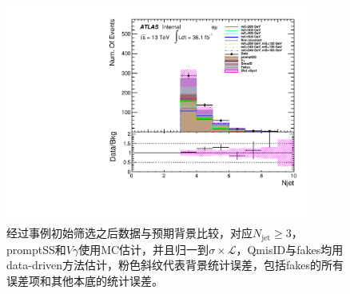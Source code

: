 \begin{figure}[h]
\begin{minipage}[t]{0.33\linewidth}
\end{minipage}
\begin{minipage}[t]{0.33\linewidth}
\centering
\includegraphics[width=0.9\textwidth,angle=-90]{fig/dataMC_high_Njet_CR/numOfjet_emu.pdf}
\end{minipage} 
\caption{经过事例初始筛选之后数据与预期背景比较，对应$N_{\text{jet}}\geq3$，promptSS和$V\gamma$使用MC估计，并且归一到$\sigma\times\mathcal{L}$，QmisID与fakes均用data-driven方法估计，粉色斜纹代表背景统计误差，包括fakes的所有误差项和其他本底的统计误差。}
\label{fig:dataMC_high_Njet_CR:numOfjet}
\end{figure}
